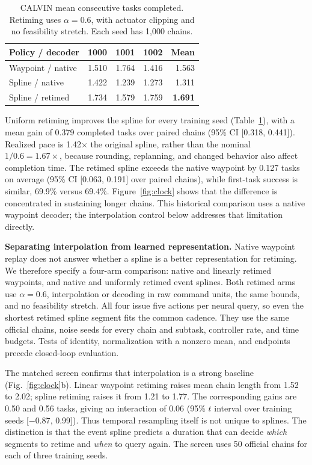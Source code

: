 \begin{table}[t]
\centering
\caption{CALVIN mean consecutive tasks completed. Retiming uses $\alpha=0.6$, with actuator clipping and no feasibility stretch. Each seed has 1,000 chains.}
\label{tab:calvin}
\setlength{\tabcolsep}{4pt}
\begin{tabular}{lrrrr}
\toprule
Policy / decoder & 1000 & 1001 & 1002 & Mean \\
\midrule
Waypoint / native & 1.510 & 1.764 & 1.416 & 1.563 \\
Spline / native & 1.422 & 1.239 & 1.273 & 1.311 \\
Spline / retimed & 1.734 & 1.579 & 1.759 & \textbf{1.691} \\
\bottomrule
\end{tabular}
\end{table}

Uniform retiming improves the spline for every training seed (Table~\ref{tab:calvin}), with a mean gain of 0.379 completed tasks over paired chains (95\% CI [0.318, 0.441]). Realized pace is 1.42$\times$ the original spline, rather than the nominal $1/0.6=1.67\times$, because rounding, replanning, and changed behavior also affect completion time. The retimed spline exceeds the native waypoint by 0.127 tasks on average (95\% CI [0.063, 0.191] over paired chains), while first-task success is similar, 69.9\% versus 69.4\%. Figure~\ref{fig:clock} shows that the difference is concentrated in sustaining longer chains. This historical comparison uses a native waypoint decoder; the interpolation control below addresses that limitation directly.

\textbf{Separating interpolation from learned representation.} Native waypoint replay does not answer whether a spline is a better representation for retiming. We therefore specify a four-arm comparison: native and linearly retimed waypoints, and native and uniformly retimed event splines. Both retimed arms use $\alpha=0.6$, interpolation or decoding in raw command units, the same bounds, and no feasibility stretch. All four issue five actions per neural query, so even the shortest retimed spline segment fits the common cadence. They use the same official chains, noise seeds for every chain and subtask, controller rate, and time budgets. Tests of identity, normalization with a nonzero mean, and endpoints precede closed-loop evaluation.

The matched screen confirms that interpolation is a strong baseline (Fig.~\ref{fig:clock}b). Linear waypoint retiming raises mean chain length from 1.52 to 2.02; spline retiming raises it from 1.21 to 1.77. The corresponding gains are 0.50 and 0.56 tasks, giving an interaction of 0.06 (95\% $t$ interval over training seeds [$-0.87$, 0.99]). Thus temporal resampling itself is not unique to splines. The distinction is that the event spline predicts a duration that can decide \emph{which} segments to retime and \emph{when} to query again. The screen uses 50 official chains for each of three training seeds.

